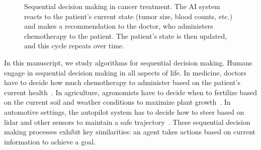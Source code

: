 \begin{figure}
    \caption{Sequential decision making in cancer treatment. The AI system reacts to the patient's current state (tumor size, blood counts, etc.) and makes a recommendation to the doctor, who administers chemotherapy to the patient. The patient's state is then updated, and this cycle repeats over time.}
    \label{fig:cancer-treatment-sdm}
\end{figure}
In this manuscript, we study algorithms for sequential decision making. Humans engage in sequential decision making in all aspects of life. In medicine, doctors have to decide how much chemotherapy to administer based on the patient's current health~\cite{cancer}. In agriculture, agronomists have to decide when to fertilize based on the current soil and weather conditions to maximize plant growth~\cite{agriculture}. 
In automotive settings, the autopilot system has to decide how to steer based on lidar and other sensors to maintain a safe trajectory~\cite{driving}. 
These sequential decision making processes exhibit key similarities: an agent takes actions based on current information to achieve a goal.

